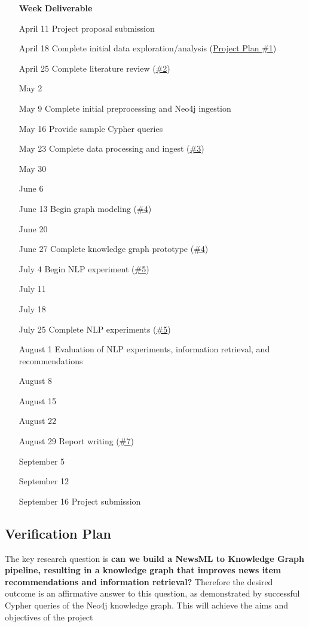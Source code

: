 \documentclass[11pt]{article}
\begin{document}
\begin{itemize}
\item [\textbf{Week}] \textbf{Deliverable}
\item [April 11] Project proposal submission
\item [April 18] Complete initial data exploration/analysis (\hyperref[sec:PropDataExploration]{Project Plan \#1})
\item [April 25] Complete literature review (\hyperref[sec:PropLiteratureReview]{\#2})

\item [May 2]
\item [May 9] Complete initial preprocessing and Neo4j ingestion
\item [May 16] Provide sample Cypher queries
\item [May 23] Complete data processing and ingest (\hyperref[sec:PropDataProcessing]{\#3})
\item [May 30]

\item [June 6]
\item [June 13] Begin graph modeling (\hyperref[sec:PropGraphModeling]{\#4})
\item [June 20]
\item [June 27] Complete knowledge graph prototype (\hyperref[sec:PropGraphModeling]{\#4})

\item [July 4] Begin NLP experiment (\hyperref[sec:PropNLP]{\#5})
\item [July 11]
\item [July 18]
\item [July 25] Complete NLP experiments (\hyperref[sec:PropNLP]{\#5})

\item [August 1] Evaluation of NLP experiments, information retrieval, and recommendations
\item [August 8]
\item [August 15]
\item [August 22]
\item [August 29] Report writing (\hyperref[sec:PropWrittenReport]{\#7})

\item [September 5]
\item [September 12]
\item [September 16] Project submission
\end{itemize}

\subsection{Verification Plan}
The key research question is \textbf{can we build a NewsML to Knowledge Graph pipeline, resulting in a knowledge graph that improves news item recommendations and information retrieval?} Therefore the desired outcome is an affirmative answer to this question, as demonstrated by successful Cypher queries of the Neo4j knowledge graph. This will achieve the aims and objectives of the project
\end{document}

